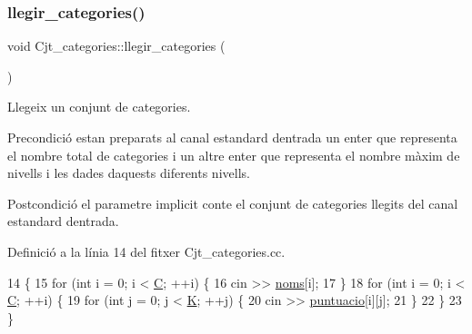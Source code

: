 \subsubsection{\texorpdfstring{llegir\+\_\+categories()}{llegir\_categories()}}
{\footnotesize\ttfamily void Cjt\+\_\+categories\+::llegir\+\_\+categories (\begin{DoxyParamCaption}{ }\end{DoxyParamCaption})}



Llegeix un conjunt de categories. 

\begin{DoxyPrecond}{Precondició}
estan preparats al canal estandard d\textquotesingle{}entrada un enter que representa el nombre total de categories i un altre enter que representa el nombre màxim de nivells i les dades d\textquotesingle{}aquests diferents nivells. 
\end{DoxyPrecond}
\begin{DoxyPostcond}{Postcondició}
el parametre implicit conte el conjunt de categories llegits del canal estandard d\textquotesingle{}entrada. 
\end{DoxyPostcond}


Definició a la línia 14 del fitxer Cjt\+\_\+categories.\+cc.


\begin{DoxyCode}
14                                        \{
15     \textcolor{keywordflow}{for} (\textcolor{keywordtype}{int} i = 0; i < \mbox{\hyperlink{class_cjt__categories_a1d3d6eb2bd5a981ca1e56d4d16e7d1c1}{C}}; ++i) \{
16         cin >> \mbox{\hyperlink{class_cjt__categories_a45622c30fae365dc72f2d7aa5fbc3bfc}{noms}}[i]; 
17     \}
18     \textcolor{keywordflow}{for} (\textcolor{keywordtype}{int} i = 0; i < \mbox{\hyperlink{class_cjt__categories_a1d3d6eb2bd5a981ca1e56d4d16e7d1c1}{C}}; ++i) \{ 
19         \textcolor{keywordflow}{for} (\textcolor{keywordtype}{int} j = 0; j < \mbox{\hyperlink{class_cjt__categories_a3e7981c4f9b0aa3e0d5999ffa291ce54}{K}}; ++j) \{ 
20             cin >> \mbox{\hyperlink{class_cjt__categories_a121b331af19b7307f320b21f0edd8b30}{puntuacio}}[i][j];
21         \}
22     \}
23 \}
\end{DoxyCode}
\mbox{\label{class_cjt__categories_ad1a67d725173663782d1385ff59f0be6}} 
